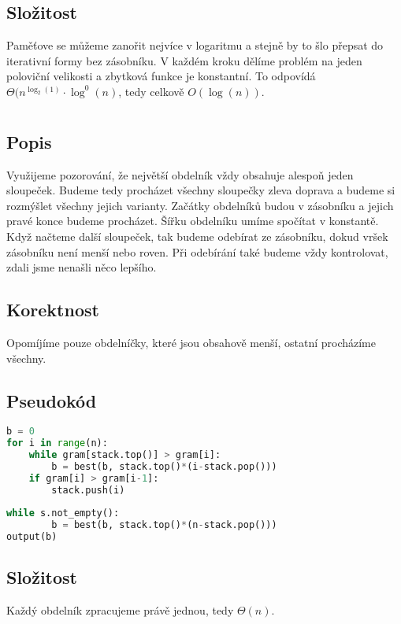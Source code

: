 \documentclass[a4paper]{article}
\begin{document}
\subsection{Složitost}
Paměťove se můžeme zanořit nejvíce v logaritmu a stejně by to šlo přepsat do iterativní formy bez zásobníku. V každém kroku dělíme problém na jeden poloviční velikosti a zbytková funkce je konstantní. To odpovídá $\Theta(n^{\log_2(1)} \cdot \log^0(n)$, tedy celkově $O(\log(n))$.

\section{}
\subsection{Popis}
Využijeme pozorování, že největší obdelník vždy obsahuje alespoň jeden sloupeček. Budeme tedy procházet všechny sloupečky zleva doprava a budeme si rozmýšlet všechny jejich varianty. Začátky obdelníků budou v zásobníku a jejich pravé konce budeme procházet. Šířku obdelníku umíme spočítat v konstantě. Když načteme další sloupeček, tak budeme odebírat ze zásobníku, dokud vršek zásobníku není menší nebo roven. Při odebírání také budeme vždy kontrolovat, zdali jsme nenašli něco lepšího.

\subsection{Korektnost}
Opomíjíme pouze obdelníčky, které jsou obsahově menší, ostatní procházíme všechny.


\subsection{Pseudokód}
\begin{lstlisting}[language=Python]
b = 0
for i in range(n):
	while gram[stack.top()] > gram[i]:
		b = best(b, stack.top()*(i-stack.pop()))
	if gram[i] > gram[i-1]:
		stack.push(i)
		
while s.not_empty():
		b = best(b, stack.top()*(n-stack.pop()))
output(b)
\end{lstlisting}

\subsection{Složitost}
Každý obdelník zpracujeme právě jednou, tedy $\Theta(n)$.
\end{document}
